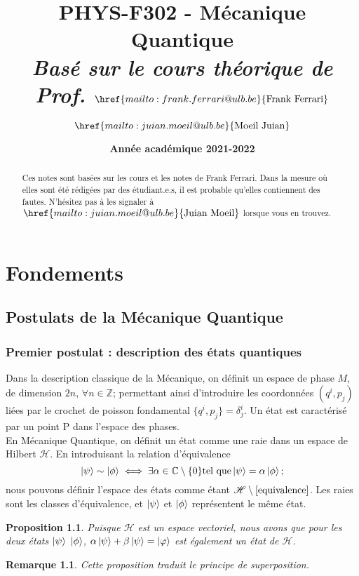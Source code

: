 \documentclass{report}
\title{\textbf{PHYS-F302 - Mécanique Quantique} \\ \textit{Basé sur le cours théorique de Prof. $\href{mailto:frank.ferrari@ulb.be}{\text{Frank Ferrari}}$}}
\author{$\href{mailto:juian.moeil@ulb.be}{\text{Moeil Juian}}$}
\date{\textbf{Année académique 2021-2022}}
\numberwithin{equation}{part}
\newtheorem{Property}[theorem]{Proposition}
\newtheorem{remark}[theorem]{Remarque}
\begin{document}
\maketitle

\begin{abstract}
    Ces notes sont basées sur les cours et les notes de Frank Ferrari. Dans la mesure où elles sont été rédigées par des étudiant.e.s, il est probable qu'elles contiennent des fautes. N'hésitez pas à les signaler à $\href{mailto:juian.moeil@ulb.be}{\text{Juian Moeil}}$ lorsque vous en trouvez.
\end{abstract}
\newpage

\part{Fondements}

\chapter{Postulats de la Mécanique Quantique}

\section{Premier postulat : description des états quantiques}

Dans la description classique de la Mécanique, on définit un espace de phase $M$, de dimension $2n$, $\forall n\in\mathbb{Z}$; permettant ainsi d'introduire les coordonnées $\left(q^i,p_j\right)$ liées par le crochet de poisson fondamental $\{q^i,p_j\}=\delta^i_j$. Un état est caractérisé par un point P dans l'espace des phases.\\

En Mécanique Quantique, on définit un état comme une raie dans un espace de Hilbert $\mathcal{H}$. En introduisant la relation d'équivalence
\begin{equation}
\label{equivalence}
    \ket{\psi} \sim \ket{\phi} \iff \exists \alpha\in\mathbb{C}\setminus\{0\} \text{tel que} \ket{\psi}=\alpha\ket{\phi} ;
\end{equation}
nous pouvons définir l'espace des états comme étant $\mathcal{H}\setminus\ref{equivalence}$. Les raies sont les classes d'équivalence, et $\ket{\psi}$ et $\ket{\phi}$ représentent le même état.\\

\begin{Property}
    Puisque $\mathcal{H}$ est un espace vectoriel, nous avons que pour les deux états $\ket{\psi}$ $\ket{\phi}$, $\alpha\ket{\psi}+\beta\ket{\psi}=\ket{\varphi}$ est également un état de $\mathcal{H}$.
\end{Property}

\begin{remark}
    Cette proposition traduit le principe de superposition.
\end{remark}
\end{document}
